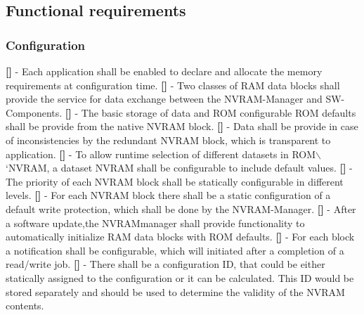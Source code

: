 \subsection{Functional requirements}

\subsubsection{Configuration}
{\bf []} - Each application shall be enabled to declare and allocate the memory requirements at configuration time.\newline
\newline
{\bf []} - Two classes of RAM data blocks shall provide the service for data exchange between the NVRAM-Manager and SW-Components.\newline
\newline
{\bf []} - The basic storage of data and ROM configurable ROM defaults shall be provide from the native \mbox{NVRAM} block.\newline
\newline
{\bf []} - Data shall be provide in case of inconsistencies by the redundant  \mbox{NVRAM} block, which is transparent to application.\newline
\newline
{\bf []} - To allow runtime selection of different datasets in \mbox{ROM$\backslash$`NVRAM}, a dataset  \mbox{NVRAM} shall be configurable to include default values.\newline
\newline
{\bf []} - The priority of each NVRAM block shall be statically configurable in different levels.\newline\newline
{\bf []} - For each \mbox{NVRAM} block there shall be a static configuration of a default write protection, which shall be done by the \mbox{NVRAM-Manager}.\newline
\newline
{\bf []} - After a software update,the \mbox{NVRAM}manager shall provide functionality to automatically initialize RAM data blocks with ROM defaults.\newline
\newline
{\bf []} - For each block a notification shall be configurable, which will initiated after a completion of a read/write job.\newline
\newline
{\bf []} - There shall be a configuration ID, that could be either statically assigned to the configuration or it can be calculated. This ID would be stored separately and should be used to determine the validity of the NVRAM contents.\newline
